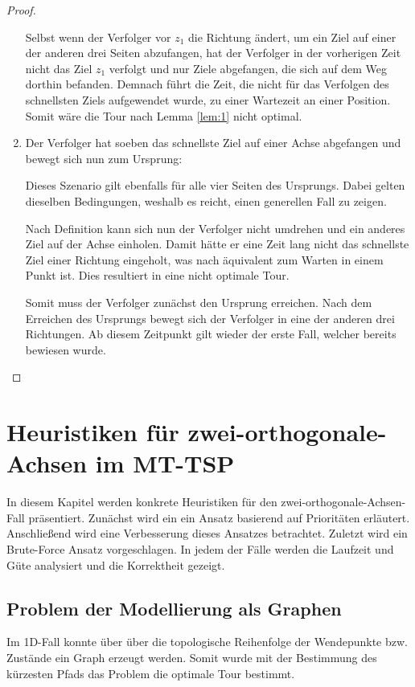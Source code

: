 \documentclass[german,version-2019-11]{uzl-thesis}
\begin{document}
\begin{proof}
\begin{enumerate}
Selbst wenn der Verfolger vor $z_1$ die Richtung ändert, um ein Ziel auf einer der anderen drei Seiten abzufangen, hat der Verfolger in der vorherigen Zeit nicht das Ziel $z_1$ verfolgt und nur Ziele abgefangen, die sich auf dem Weg dorthin befanden. Demnach führt die Zeit, die nicht für das Verfolgen des schnellsten Ziels aufgewendet wurde, zu einer Wartezeit an einer Position. Somit wäre die Tour nach Lemma \ref{lem:1} nicht optimal.\\

\item 
Der Verfolger hat soeben das schnellste Ziel auf einer Achse abgefangen und bewegt sich nun zum Ursprung:

Dieses Szenario gilt ebenfalls für alle vier Seiten des Ursprungs. Dabei gelten dieselben Bedingungen, weshalb es reicht, einen generellen Fall zu zeigen. 

Nach Definition kann sich nun der Verfolger nicht umdrehen und ein anderes Ziel auf der Achse einholen. Damit hätte er eine Zeit lang nicht das schnellste Ziel einer Richtung eingeholt, was  nach \cite{helvig} äquivalent zum Warten in einem Punkt ist. Dies resultiert in eine nicht optimale Tour.

Somit muss der Verfolger zunächst den Ursprung erreichen. Nach dem Erreichen des Ursprungs bewegt  sich der Verfolger in eine der anderen drei Richtungen. Ab diesem Zeitpunkt gilt wieder der erste Fall, welcher bereits bewiesen wurde.
\end{enumerate} 
\end{proof}


\chapter{Heuristiken für zwei-orthogonale-Achsen im MT-TSP}
\label{kap4}
In diesem Kapitel werden konkrete Heuristiken für den zwei-orthogonale-Achsen-Fall präsentiert. Zunächst wird ein ein Ansatz basierend auf Prioritäten erläutert. Anschließend wird eine Verbesserung dieses Ansatzes betrachtet. Zuletzt wird ein Brute-Force Ansatz vorgeschlagen. In jedem der Fälle werden die Laufzeit und Güte analysiert und die Korrektheit gezeigt.

\section{Problem der Modellierung als Graphen}
Im 1D-Fall konnte über über die topologische Reihenfolge der Wendepunkte bzw. Zustände ein Graph erzeugt werden. Somit wurde mit der Bestimmung des kürzesten Pfads das Problem die optimale Tour bestimmt. 
\end{document}
